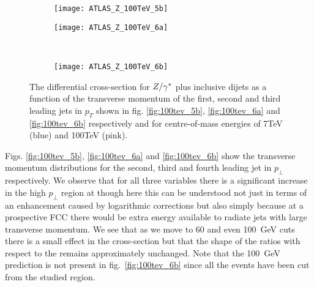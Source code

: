 	\begin{figure}[bth]
		\centering
		\begin{subfigure}[b]{0.48\textwidth}
			\texttt{[image: ATLAS\_Z\_100TeV\_5b]}
			\caption{}
			\label{fig:100tev_5b}
		\end{subfigure}

		\begin{subfigure}[b]{0.48\textwidth}
			\texttt{[image: ATLAS\_Z\_100TeV\_6a]}
			\caption{}
			\label{fig:100tev_6a}
		\end{subfigure}
		~
		\begin{subfigure}[b]{0.48\textwidth}
			\texttt{[image: ATLAS\_Z\_100TeV\_6b]}
			\caption{}
			\label{fig:100tev_6b}
		\end{subfigure}
		\caption{The differential cross-section for $Z/\gamma^*$ plus inclusive dijets as a function of the transverse momentum
		         of the first, second and third leading jets in $p_T$ shown in fig. \eqref{fig:100tev_5b}, \eqref{fig:100tev_6a}
		         and \eqref{fig:100tev_6b} respectively and for centre-of-mass energies of 7TeV (blue) and 100TeV (pink).}
	\end{figure}

	Figs. \eqref{fig:100tev_5b}, \eqref{fig:100tev_6a} and \eqref{fig:100tev_6b} show the transverse momentum
	distributions for the second, third and fourth leading jet in $p_\perp$ respectively.  We observe that for all three
	variables there is a significant increase in the high $p_\perp$ region at \htev though here this can be understood
	not just in terms of an enhancement caused by logarithmic corrections but also simply because at a prospective FCC
	there would be extra energy available to radiate jets with large transverse momentum.  We see that as we move to
	60 and even 100~GeV cuts there is a small effect in the cross-section but that the shape of the ratios with respect
	to the \stev remains approximately unchanged.  Note that the 100~GeV prediction is not present in
	fig.~\eqref{fig:100tev_6b} since all the events have been cut from the studied region.

